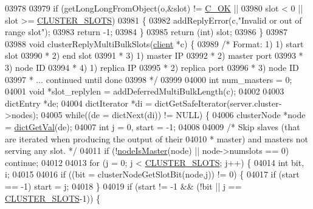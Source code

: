 \begin{DoxyCode}
{{{{{{{{{{{{{{{{{{{{{{{{{{{{{{{{{{{{{{{{{{{{{{{{{{{{{{{{{{{{{{{{{{{{{{{03978 
03979     \textcolor{keywordflow}{if} (getLongLongFromObject(o,&slot) != \hyperlink{server_8h_a303769ef1065076e68731584e758d3e1}{C\_OK} ||
03980         slot < 0 || slot >= \hyperlink{cluster_8h_aa3e2cb951eebb16725ecc3f5beefd9fd}{CLUSTER\_SLOTS})
03981     \{
03982         addReplyError(c,\textcolor{stringliteral}{"Invalid or out of range slot"});
03983         \textcolor{keywordflow}{return} -1;
03984     \}
03985     \textcolor{keywordflow}{return} (\textcolor{keywordtype}{int}) slot;
03986 \}
03987 
03988 \textcolor{keywordtype}{void} clusterReplyMultiBulkSlots(\hyperlink{structclient}{client} *c) \{
03989     \textcolor{comment}{/* Format: 1) 1) start slot}
03990 \textcolor{comment}{     *            2) end slot}
03991 \textcolor{comment}{     *            3) 1) master IP}
03992 \textcolor{comment}{     *               2) master port}
03993 \textcolor{comment}{     *               3) node ID}
03994 \textcolor{comment}{     *            4) 1) replica IP}
03995 \textcolor{comment}{     *               2) replica port}
03996 \textcolor{comment}{     *               3) node ID}
03997 \textcolor{comment}{     *           ... continued until done}
03998 \textcolor{comment}{     */}
03999 
04000     \textcolor{keywordtype}{int} num\_masters = 0;
04001     \textcolor{keywordtype}{void} *slot\_replylen = addDeferredMultiBulkLength(c);
04002 
04003     dictEntry *de;
04004     dictIterator *di = dictGetSafeIterator(server.cluster->nodes);
04005     \textcolor{keywordflow}{while}((de = dictNext(di)) != NULL) \{
04006         clusterNode *node = \hyperlink{dict_8h_ae8d2cc391873b2bea2b87c4f80f43120}{dictGetVal}(de);
04007         \textcolor{keywordtype}{int} j = 0, start = -1;
04008 
04009         \textcolor{comment}{/* Skip slaves (that are iterated when producing the output of their}
04010 \textcolor{comment}{         * master) and  masters not serving any slot. */}
04011         \textcolor{keywordflow}{if} (!\hyperlink{cluster_8h_a2d8e84269474d8750565fb3fb67aa436}{nodeIsMaster}(node) || node->numslots == 0) \textcolor{keywordflow}{continue};
04012 
04013         \textcolor{keywordflow}{for} (j = 0; j < \hyperlink{cluster_8h_aa3e2cb951eebb16725ecc3f5beefd9fd}{CLUSTER\_SLOTS}; j++) \{
04014             \textcolor{keywordtype}{int} bit, i;
04015 
04016             \textcolor{keywordflow}{if} ((bit = clusterNodeGetSlotBit(node,j)) != 0) \{
04017                 \textcolor{keywordflow}{if} (start == -1) start = j;
04018             \}
04019             \textcolor{keywordflow}{if} (start != -1 && (!bit || j == \hyperlink{cluster_8h_aa3e2cb951eebb16725ecc3f5beefd9fd}{CLUSTER\_SLOTS}-1)) \{
}}}}}}}}}}}}}}}}}}}}}}}}}}}}}}}}}}}}}}}}}}}}}}}}}}}}}}}}}}}}}}}}}}}}}}}
\end{DoxyCode}
